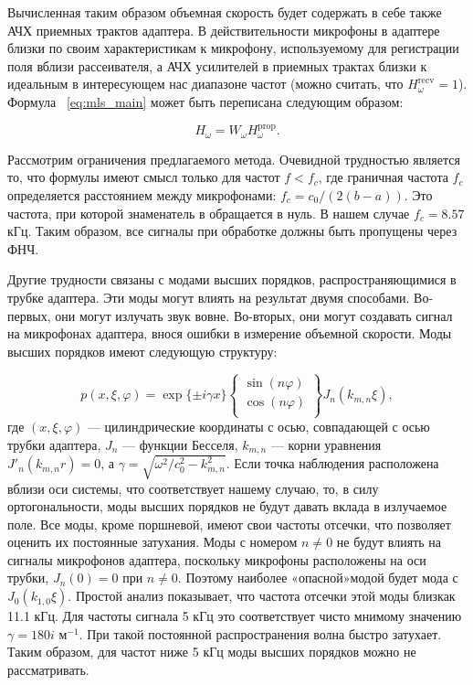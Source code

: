 Вычисленная таким образом объемная скорость будет содержать в себе также АЧХ приемных трактов адаптера. В действительности микрофоны в адаптере близки по своим характеристикам к микрофону, используемому для регистрации поля вблизи рассеивателя, а АЧХ усилителей в приемных трактах близки к идеальным в интересующем нас диапазоне частот (можно
считать, что $H_\omega^{\text{recv}} = 1$). Формула ~\eqref{eq:mls_main} может быть переписана следующим образом:

\begin{equation}
H_\omega = W_\omega H_\omega^{\text{prop}}.
\end{equation}

Рассмотрим ограничения предлагаемого метода. Очевидной трудностью является то, что формулы \label{eq:twomic} имеют смысл только для частот $f < f_c$, где граничная частота $f_c$ определяется расстоянием между микрофонами: $f_c = c_0/(2(b-a))$. Это частота, при которой знаменатель в \label{eq:twomic} обращается в нуль. В нашем случае \textbf{$f_c = 8.57$} кГц. Таким образом, все сигналы при обработке должны быть пропущены через ФНЧ. 

Другие трудности связаны с модами высших порядков, распространяющимися в трубке адаптера. Эти моды могут влиять на результат двумя способами. Во-первых, они могут излучать звук вовне. Во-вторых, они могут создавать сигнал на микрофонах адаптера, внося ошибки в измерение объемной скорости. Моды высших порядков имеют следующую структуру:

\begin{equation}
p(x, \xi, \varphi) = \exp\{\pm i \gamma x \}\begin{Bmatrix}
\sin(n\varphi) \\
\cos(n\varphi) \\
\end{Bmatrix} J_n(k_{m,n}\xi),
\end{equation}
где $(x, \xi, \varphi)$ — цилиндрические координаты с осью, совпадающей с осью трубки адаптера, $J_n$ — функции Бесселя, $k_{m,n}$ — корни уравнения $J'_n(k_{m,n} r) = 0$, а $\gamma = \sqrt{\omega^2/c_0^2 - k_{m,n}^2}$. Если точка наблюдения расположена вблизи оси системы, что соответствует нашему случаю, то, в силу ортогональности, моды высших порядков не будут давать вклада в излучаемое поле. Все моды, кроме поршневой, имеют свои частоты отсечки, что позволяет оценить их постоянные затухания. Моды с номером $n\neq 0$ не будут влиять на сигналы микрофонов адаптера, поскольку микрофоны расположены на оси трубки, $J_n(0) = 0$ при $n \neq 0$. Поэтому наиболее «опасной»модой будет мода с $J_0(k_{1,0}\xi)$. Простой анализ показывает, что частота отсечки этой моды близкак 11.1 кГц. Для частоты сигнала 5 кГц это соответствует чисто мнимому значению $\gamma = 180i$ $\text{м}^{-1}$. При такой постоянной распространения волна быстро затухает. Таким образом, для частот ниже 5 кГц моды высших порядков можно не рассматривать.

